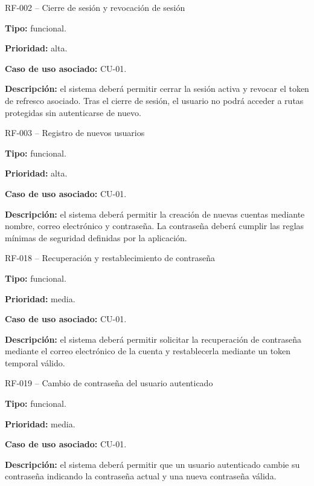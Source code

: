 \begin{requisitocard}{RF-002 -- Cierre de sesión y revocación de sesión}

\textbf{Tipo:} funcional.

\textbf{Prioridad:} alta.

\textbf{Caso de uso asociado:} CU-01.

\textbf{Descripción:} el sistema deberá permitir cerrar la sesión activa y revocar
el token de refresco asociado. Tras el cierre de sesión, el usuario no podrá
acceder a rutas protegidas sin autenticarse de nuevo.

\end{requisitocard}

\begin{requisitocard}{RF-003 -- Registro de nuevos usuarios}

\textbf{Tipo:} funcional.

\textbf{Prioridad:} alta.

\textbf{Caso de uso asociado:} CU-01.

\textbf{Descripción:} el sistema deberá permitir la creación de nuevas cuentas
mediante nombre, correo electrónico y contraseña. La contraseña deberá cumplir las
reglas mínimas de seguridad definidas por la aplicación.

\end{requisitocard}

\begin{requisitocard}{RF-018 -- Recuperación y restablecimiento de contraseña}

\textbf{Tipo:} funcional.

\textbf{Prioridad:} media.

\textbf{Caso de uso asociado:} CU-01.

\textbf{Descripción:} el sistema deberá permitir solicitar la recuperación de
contraseña mediante el correo electrónico de la cuenta y restablecerla mediante un
token temporal válido.

\end{requisitocard}

\begin{requisitocard}{RF-019 -- Cambio de contraseña del usuario autenticado}

\textbf{Tipo:} funcional.

\textbf{Prioridad:} media.

\textbf{Caso de uso asociado:} CU-01.

\textbf{Descripción:} el sistema deberá permitir que un usuario autenticado cambie
su contraseña indicando la contraseña actual y una nueva contraseña válida.

\end{requisitocard}

